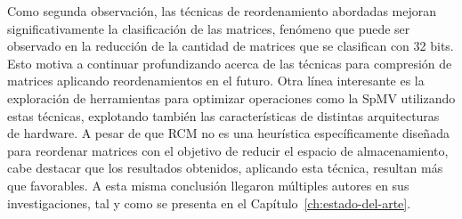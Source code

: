 Como segunda observación, las técnicas de reordenamiento abordadas mejoran significativamente la clasificación de las matrices, fenómeno que puede ser observado en la reducción de la cantidad de matrices que se clasifican con 32 bits. 
Esto motiva a continuar profundizando acerca de las técnicas para compresión de matrices aplicando reordenamientos en el futuro.
Otra línea interesante es la exploración de herramientas para optimizar operaciones como la SpMV utilizando estas técnicas, explotando también las características de distintas arquitecturas de hardware.
A pesar de que RCM no es una heurística específicamente diseñada para reordenar matrices con el objetivo de reducir el espacio de almacenamiento, cabe destacar que los resultados obtenidos, aplicando esta técnica, resultan más que favorables. A esta misma conclusión llegaron múltiples autores en sus investigaciones, tal y como se presenta en el Capítulo~\ref{ch:estado-del-arte}.

